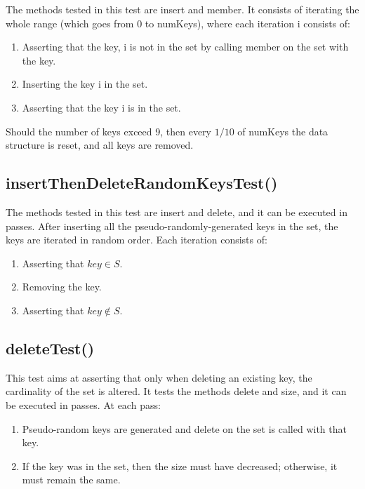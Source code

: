 The methods tested in this test are {\ttfamily insert} and {\ttfamily member}. It consists of iterating the whole range (which goes from $0$ to {\ttfamily numKeys}), where each iteration {\ttfamily i} consists of:
\begin{enumerate}
    \item
    Asserting that the key, {\ttfamily i} is not in the set by calling {\ttfamily member} on the set with the key.
    \item
    Inserting the key {\ttfamily i} in the set.
    \item
    Asserting that the key {\ttfamily i} is in the set.
\end{enumerate}
Should the number of keys exceed 9, then every $1/10$ of {\ttfamily numKeys} the data structure is reset, and all keys are removed.

\subsection{{\ttfamily insertThenDeleteRandomKeysTest()}}

The methods tested in this test are {\ttfamily insert} and {\ttfamily delete}, and it can be executed in passes. After inserting all the pseudo-randomly-generated keys in the set, the keys are iterated in random order. Each iteration consists of:
\begin{enumerate}
    \item
    Asserting that $key \in S$.
    \item
    Removing the key.
    \item
    Asserting that $key \not\in S$.
\end{enumerate}

\subsection{{\ttfamily deleteTest()}}

This test aims at asserting that only when deleting an existing key, the cardinality of the set is altered. It tests the methods {\ttfamily delete} and size, and it can be executed in passes. At each pass:
\begin{enumerate}
    \item
    Pseudo-random keys are generated and delete on the set is called with that key.
    \item
    If the key was in the set, then the size must have decreased; otherwise, it must remain the same.
\end{enumerate}

